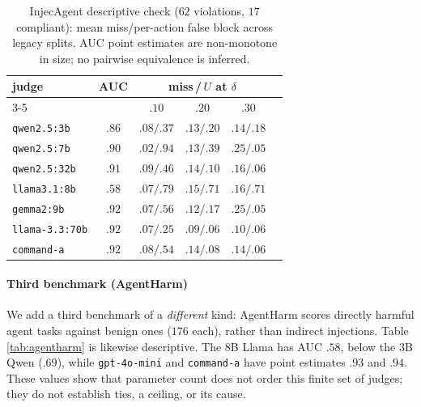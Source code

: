 \begin{table}[t]
\caption{InjecAgent descriptive check ($62$ violations, $17$ compliant):
mean miss/per-action false block across legacy splits. AUC point estimates are
non-monotone in size; no pairwise equivalence is inferred.}
\label{tab:injecagent}
\centering\small\setlength{\tabcolsep}{5pt}
\begin{tabular}{@{}lccccc@{}}
\toprule
judge & AUC & \multicolumn{3}{c}{miss\,/\,$U$ at $\delta$} \\
\cmidrule(lr){3-5}
 & & $.10$ & $.20$ & $.30$ \\
\midrule
\texttt{qwen2.5:3b}  & $.86$ & $.08/.37$ & $.13/.20$ & $.14/.18$\\
\texttt{qwen2.5:7b}  & $.90$ & $.02/.94$ & $.13/.39$ & $.25/.05$\\
\texttt{qwen2.5:32b} & $.91$ & $.09/.46$ & $.14/.10$ & $.16/.06$\\
\texttt{llama3.1:8b} & $.58$ & $.07/.79$ & $.15/.71$ & $.16/.71$\\
\texttt{gemma2:9b}   & $.92$ & $.07/.56$ & $.12/.17$ & $.25/.05$\\
\texttt{llama-3.3:70b}& $.92$ & $.07/.25$ & $.09/.06$ & $.10/.06$\\
\texttt{command-a}   & $.92$ & $.08/.54$ & $.14/.08$ & $.14/.06$\\
\bottomrule
\end{tabular}
\end{table}

\paragraph{Third benchmark (AgentHarm)} We add a third benchmark of a \emph{different}
kind: AgentHarm \citep{andriushchenko2025agentharm} scores directly harmful agent
tasks against benign ones ($176$ each), rather than indirect injections. Table
\ref{tab:agentharm} is likewise descriptive. The $8$B Llama has AUC $.58$,
below the $3$B Qwen ($.69$), while \texttt{gpt-4o-mini} and
\texttt{command-a} have point estimates $.93$ and $.94$. These values show
that parameter count does not order this finite set of judges; they do not establish
ties, a ceiling, or its cause.

